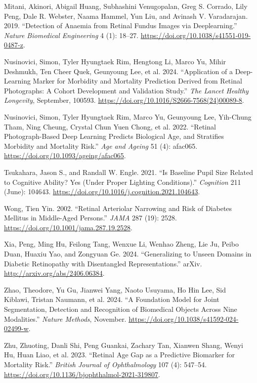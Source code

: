\documentclass[
  Letterpaper,
]{scrbook}
\newlength{\cslhangindent}
\newenvironment{CSLReferences}[2] %
 {\begin{list}{}{%
  \setlength{\itemindent}{0pt}
  \setlength{\leftmargin}{0pt}
  \setlength{\parsep}{0pt}
  \ifodd #1
   \setlength{\leftmargin}{\cslhangindent}
   \setlength{\itemindent}{-1\cslhangindent}
  \fi
  \setlength{\itemsep}{#2\baselineskip}}}
 {\end{list}}
\begin{document}
\begin{CSLReferences}{1}{0}
Mitani, Akinori, Abigail Huang, Subhashini Venugopalan, Greg S. Corrado,
Lily Peng, Dale R. Webster, Naama Hammel, Yun Liu, and Avinash V.
Varadarajan. 2019. {``Detection of Anaemia from Retinal Fundus Images
via Deeplearning.''} \emph{Nature Biomedical Engineering} 4 (1): 18--27.
\url{https://doi.org/10.1038/s41551-019-0487-z}.

Nusinovici, Simon, Tyler Hyungtaek Rim, Hengtong Li, Marco Yu, Mihir
Deshmukh, Ten Cheer Quek, Geunyoung Lee, et al. 2024. {``Application of
a Deep-Learning Marker for Morbidity and Mortality Prediction Derived
from Retinal Photographs: A Cohort Development and Validation Study.''}
\emph{The Lancet Healthy Longevity}, September, 100593.
\url{https://doi.org/10.1016/S2666-7568(24)00089-8}.

Nusinovici, Simon, Tyler Hyungtaek Rim, Marco Yu, Geunyoung Lee,
Yih-Chung Tham, Ning Cheung, Crystal Chun Yuen Chong, et al. 2022.
{``Retinal Photograph-Based Deep Learning Predicts Biological Age, and
Stratifies Morbidity and Mortality Risk.''} \emph{Age and Ageing} 51
(4): afac065. \url{https://doi.org/10.1093/ageing/afac065}.

Tsukahara, Jason S., and Randall W. Engle. 2021. {``Is Baseline Pupil
Size Related to Cognitive Ability? {Yes} (Under Proper Lighting
Conditions).''} \emph{Cognition} 211 (June): 104643.
\url{https://doi.org/10.1016/j.cognition.2021.104643}.

Wong, Tien Yin. 2002. {``Retinal {Arteriolar} {Narrowing} and {Risk} of
{Diabetes} {Mellitus} in {Middle}-Aged {Persons}.''} \emph{JAMA} 287
(19): 2528. \url{https://doi.org/10.1001/jama.287.19.2528}.

Xia, Peng, Ming Hu, Feilong Tang, Wenxue Li, Wenhao Zheng, Lie Ju, Peibo
Duan, Huaxiu Yao, and Zongyuan Ge. 2024. {``Generalizing to {Unseen}
{Domains} in {Diabetic} {Retinopathy} with {Disentangled}
{Representations}.''} arXiv. \url{http://arxiv.org/abs/2406.06384}.

Zhao, Theodore, Yu Gu, Jianwei Yang, Naoto Usuyama, Ho Hin Lee, Sid
Kiblawi, Tristan Naumann, et al. 2024. {``A Foundation Model for Joint
Segmentation, Detection and Recognition of Biomedical Objects Across
Nine Modalities.''} \emph{Nature Methods}, November.
\url{https://doi.org/10.1038/s41592-024-02499-w}.

Zhu, Zhuoting, Danli Shi, Peng Guankai, Zachary Tan, Xianwen Shang,
Wenyi Hu, Huan Liao, et al. 2023. {``Retinal Age Gap as a Predictive
Biomarker for Mortality Risk.''} \emph{British Journal of Ophthalmology}
107 (4): 547--54.
\url{https://doi.org/10.1136/bjophthalmol-2021-319807}.

\end{CSLReferences}


\backmatter
\end{document}

